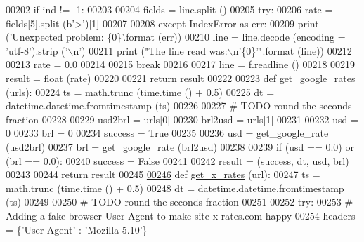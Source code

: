 \begin{DoxyCode}
{{{00202         \textcolor{keywordflow}{if} ind != -1:
00203             
00204             fields = line.split ()
00205             \textcolor{keywordflow}{try}:
00206                 rate = fields[5].split (b\textcolor{stringliteral}{'>'})[1]
00207                 
00208             \textcolor{keywordflow}{except} IndexError \textcolor{keyword}{as} err:
00209                 \textcolor{keywordflow}{print} (\textcolor{stringliteral}{'Unexpected problem: \{0\}'}.format (err))
00210                 line = line.decode (encoding = \textcolor{stringliteral}{'utf-8'}).strip (\textcolor{stringliteral}{'\(\backslash\)n'})
00211                 \textcolor{keywordflow}{print} (\textcolor{stringliteral}{"The line read was:\(\backslash\)n'\{0\}'"}.format (line))
00212                 
00213                 rate = 0.0
00214             
00215             \textcolor{keywordflow}{break}
00216             
00217         line = f.readline ()
00218     
00219     result = float (rate)
00220     
00221     \textcolor{keywordflow}{return} result
00222     
\hyperlink{namespaceexch2exch_ae0891a93a4a9cfe932011afddd41808d}{00223} \textcolor{keyword}{def }\hyperlink{namespaceexch2exch_ae0891a93a4a9cfe932011afddd41808d}{get\_google\_rates} (urls):
00224     ts = math.trunc (time.time () + 0.5)
00225     dt = datetime.datetime.fromtimestamp (ts)
00226     
00227     \textcolor{comment}{# TODO round the seconds fraction}
00228     
00229     usd2brl = urls[0]
00230     brl2usd = urls[1]
00231     
00232     usd = 0
00233     brl = 0
00234     success = \textcolor{keyword}{True}
00235     
00236     usd = get\_google\_rate (usd2brl)
00237     brl = get\_google\_rate (brl2usd)
00238     
00239     \textcolor{keywordflow}{if} (usd == 0.0) \textcolor{keywordflow}{or} (brl == 0.0):
00240         success = \textcolor{keyword}{False} 
00241         
00242     result = (success, dt, usd, brl)
00243     
00244     \textcolor{keywordflow}{return} result
00245         
\hyperlink{namespaceexch2exch_a928a1249a810cfd0ec5fca3ec8f764fb}{00246} \textcolor{keyword}{def }\hyperlink{namespaceexch2exch_a928a1249a810cfd0ec5fca3ec8f764fb}{get\_x\_rates} (url):
00247     ts = math.trunc (time.time () + 0.5)
00248     dt = datetime.datetime.fromtimestamp (ts)
00249     
00250     \textcolor{comment}{# TODO round the seconds fraction}
00251     
00252     \textcolor{keywordflow}{try}:
00253         \textcolor{comment}{# Adding a fake browser User-Agent to make site x-rates.com happy}
00254         headers = \{\textcolor{stringliteral}{'User-Agent'} : \textcolor{stringliteral}{'Mozilla 5.10'}\}
}}}
\end{DoxyCode}
